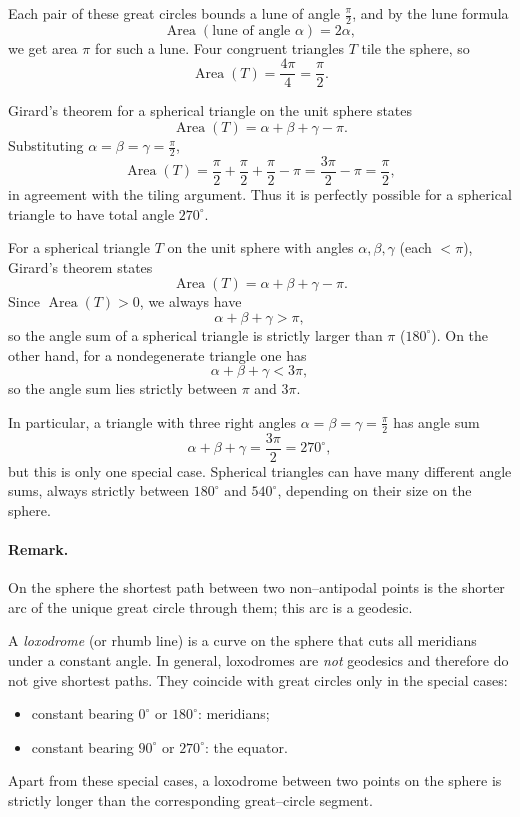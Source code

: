 \documentclass[12pt,a4paper]{article}
\theoremstyle{plain}
\theoremstyle{definition}      %
\begin{document}
Each pair of these great circles bounds a lune of angle $\frac{\pi}{2}$,
and by the lune formula
\[
\operatorname{Area}(\text{lune of angle }\alpha) = 2\alpha,
\]
we get area $\pi$ for such a lune. Four congruent triangles $T$ tile
the sphere, so
\[
\operatorname{Area}(T) = \frac{4\pi}{4} = \frac{\pi}{2}.
\]

Girard's theorem for a spherical triangle on the unit sphere states
\[
\operatorname{Area}(T) = \alpha+\beta+\gamma-\pi.
\]
Substituting $\alpha=\beta=\gamma=\frac{\pi}{2}$,
\[
\operatorname{Area}(T)
= \frac{\pi}{2}+\frac{\pi}{2}+\frac{\pi}{2}-\pi
= \frac{3\pi}{2}-\pi
= \frac{\pi}{2},
\]
in agreement with the tiling argument. Thus it is perfectly possible
for a spherical triangle to have total angle $270^\circ$.


For a spherical triangle $T$ on the unit sphere with angles
$\alpha,\beta,\gamma$ (each $<\pi$), Girard's theorem states
\[
\operatorname{Area}(T) = \alpha+\beta+\gamma-\pi.
\]
Since $\operatorname{Area}(T) > 0$, we always have
\[
\alpha+\beta+\gamma > \pi,
\]
so the angle sum of a spherical triangle is strictly larger than $\pi$
($180^\circ$). On the other hand, for a nondegenerate triangle one has
\[
\alpha+\beta+\gamma < 3\pi,
\]
so the angle sum lies strictly between $\pi$ and $3\pi$.

In particular, a triangle with three right angles
$\alpha=\beta=\gamma=\frac{\pi}{2}$ has angle sum
\[
\alpha+\beta+\gamma = \frac{3\pi}{2} = 270^\circ,
\]
but this is only one special case. Spherical triangles can have many
different angle sums, always strictly between $180^\circ$ and $540^\circ$,
depending on their size on the sphere.


\paragraph{Remark.}

On the sphere the shortest path between two non–antipodal points is the
shorter arc of the unique great circle through them; this arc is a geodesic.

A \emph{loxodrome} (or rhumb line) is a curve on the sphere that cuts all
meridians under a constant angle. In general, loxodromes are \emph{not}
geodesics and therefore do not give shortest paths. They coincide with
great circles only in the special cases:
\begin{itemize}
	\item constant bearing $0^\circ$ or $180^\circ$: meridians;
	\item constant bearing $90^\circ$ or $270^\circ$: the equator.
\end{itemize}
Apart from these special cases, a loxodrome between two points on the
sphere is strictly longer than the corresponding great--circle segment.
\end{document}

